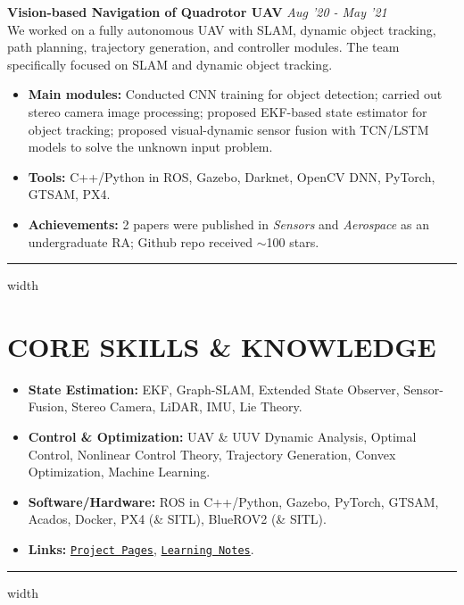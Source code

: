 \documentclass[overlapped]{res}
\newcommand{\pink}[1]{\textcolor{pink!40!red}{#1}} %
\begin{document}
\begin{resume}

\textbf{Vision-based Navigation of Quadrotor UAV} 
\hfill \textit{Aug '20 - May  '21} \\
We worked on a fully autonomous UAV with SLAM, dynamic object tracking, path planning, trajectory generation, and controller modules. The team specifically focused on SLAM and dynamic object tracking.

\begin{itemize}
  \item \textbf{Main modules:} Conducted CNN training for object detection; carried out stereo camera image processing; proposed EKF-based state estimator for object tracking; proposed visual-dynamic sensor fusion with TCN/LSTM models to solve the unknown input problem.
  \item \textbf{Tools:} C++/Python in ROS, Gazebo, Darknet, OpenCV DNN, PyTorch, GTSAM, PX4.
  \item \textbf{Achievements:} 2 papers were published in \textit{Sensors} and \textit{Aerospace} as an undergraduate RA; Github repo received $\sim$100 stars.
\end{itemize}
\par\noindent\hrule width \linewidth %

\section{CORE SKILLS \& KNOWLEDGE}
\begin{itemize}
  \item \textbf{State Estimation:} EKF, Graph-SLAM, Extended State Observer, Sensor-Fusion, Stereo Camera, LiDAR, IMU, Lie Theory.
  \item \textbf{Control \& Optimization:} UAV \& UUV Dynamic Analysis, Optimal Control, Nonlinear Control Theory, Trajectory Generation, Convex Optimization, Machine Learning. 
  \item \textbf{Software/Hardware:} ROS in C++/Python, Gazebo, PyTorch, GTSAM, Acados, Docker, PX4 (\& SITL), BlueROV2 (\& SITL).
  \item \textbf{Links:} \pink{{\texttt{\href{https://pattylo.github.io/projects/}{Project Pages}}}, {\texttt{\href{https://github.com/pattylo/learning_jungle}{Learning Notes}}}}.
\end{itemize}
\par\noindent\hrule width \linewidth %


\end{resume}
\end{document}
